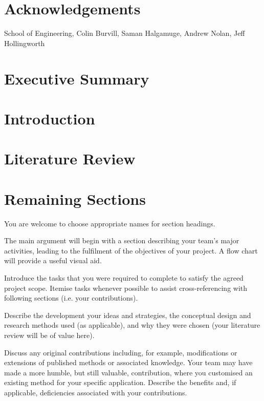 \documentclass[]{article}
\begin{document}
\vfill
\vfill

\newpage

\section*{Acknowledgements}
School of Engineering, Colin Burvill, Saman Halgamuge, Andrew Nolan, Jeff Hollingworth



\newpage
\section{Executive Summary}


\section{Introduction}


\section{Literature Review}


\section{Remaining Sections}
You are welcome to choose appropriate names for section headings.

The main argument will begin with a section describing your team’s major activities, leading to the fulfilment of the objectives of your project.  A flow chart will provide a useful visual aid.

Introduce the tasks that you were required to complete to satisfy the agreed project scope.  Itemise tasks whenever possible to assist cross-referencing with following sections (i.e. your contributions).

Describe the development your ideas and strategies, the conceptual design and research methods used (as applicable), and why they were chosen (your literature review will be of value here).  

Discuss any original contributions including, for example, modifications or extensions of published methods or associated knowledge.  Your team may have made a more humble, but still valuable, contribution, where you customised an existing method for your specific application.  Describe the benefits and, if applicable, deficiencies associated with your contributions.
\end{document}

